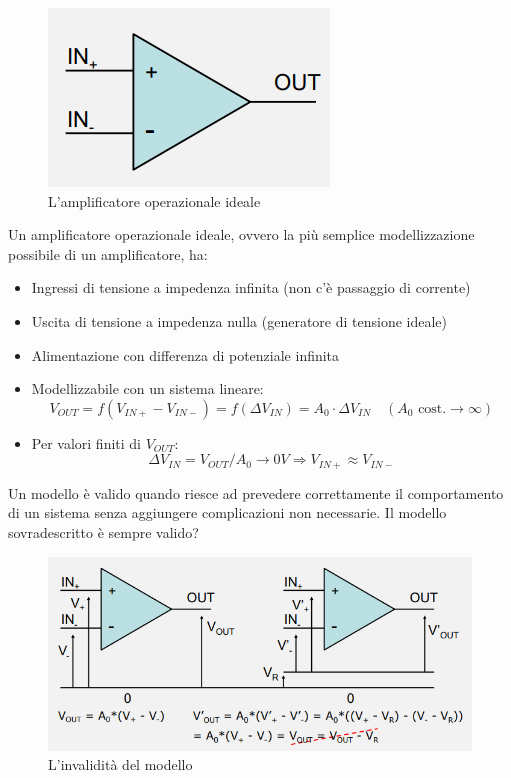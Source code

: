 \documentclass{article}
\begin{document}
\begin{figure}[h]
  \centering
  \includegraphics[scale=0.7]{IM_amplificatore_operazionale_ideale}
  \caption{L'amplificatore operazionale ideale}
  \label{Schema_amplificatore_operazionale_ideale}
\end{figure}

Un amplificatore operazionale ideale, ovvero la più semplice modellizzazione possibile di un amplificatore, ha:

\begin{itemize}
  \item Ingressi di tensione a impedenza infinita (non c'è passaggio di corrente)
  \item Uscita di tensione a impedenza nulla (generatore di tensione ideale)
  \item Alimentazione con differenza di potenziale infinita
  \item Modellizzabile con un sistema lineare:
  \[V_{OUT} = f(V_{IN+} - V_{IN-}) = f(\Delta V_{IN}) = A_0 \cdot \Delta V_{IN} \quad (A_0 \textrm{ cost.} \rightarrow \infty)\]
  \item Per valori finiti di $V_{OUT}$:
  \[\Delta V_{IN} = V_{OUT}/A_0 \rightarrow 0V \Rightarrow V_{IN+} \approx V_{IN-}\]
\end{itemize}

Un modello è valido quando riesce ad prevedere correttamente il comportamento di un sistema senza aggiungere complicazioni non necessarie. Il modello sovradescritto è sempre valido?

\begin{figure}[h]
  \centering
  \includegraphics[scale=0.55]{IM_amplificatore_operazionale_modello}
  \caption{L'invalidità del modello}
  \label{Schema_amplificatore_operazionale_modello}
\end{figure}
\end{document}
